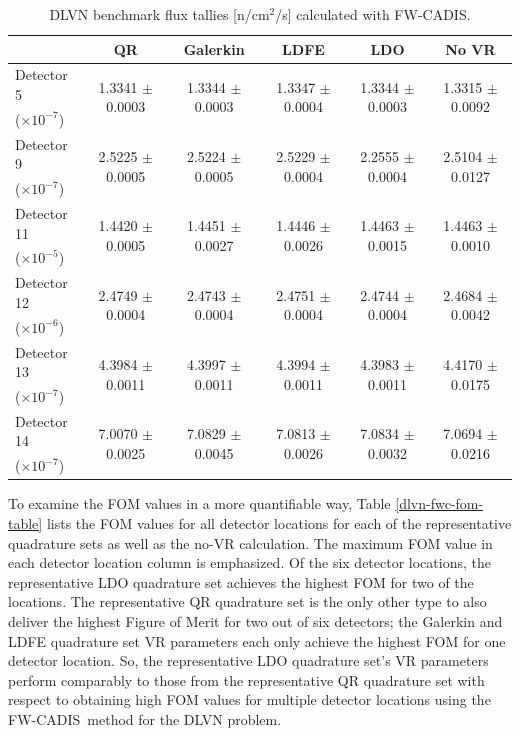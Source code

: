 \documentclass{article} %
\newcommand{\E}[1]{$\times10^{#1}$}
\newcommand{\fwc}{\mbox{FW-CADIS}}
\newcommand{\mr}[1]{\multirow{2}{*}{#1}}
\begin{document}
\begin{table}[!htb]
\centering
\scriptsize
\caption{DLVN benchmark flux tallies [n/cm$^2$/s] calculated with \fwc.}
\label{dlvn-fwc-det}
\begin{tabular}{l|ccccc}
         & \textbf{QR} & \textbf{Galerkin} & \textbf{LDFE} 
         & \textbf{LDO} & \textbf{No VR}  \\ \hline
 Detector 5 & \mr{1.3341 $\pm$ 0.0003} & \mr{1.3344 $\pm$ 0.0003} & \mr{1.3347 $\pm$ 0.0004} &
            \mr{1.3344 $\pm$ 0.0003} & \mr{1.3315 $\pm$ 0.0092} \rule{0pt}{2.6ex} \\
    (\E{-7})      &    &   &  &   &    \\
 Detector 9 & \mr{2.5225 $\pm$ 0.0005} & \mr{2.5224 $\pm$ 0.0005} & \mr{2.5229 $\pm$ 0.0004} &
            \mr{2.2555 $\pm$ 0.0004} & \mr{2.5104 $\pm$ 0.0127} \rule{0pt}{2.6ex}  \\
   (\E{-7}) &   &  &  &  &   \\
 Detector 11 & \mr{1.4420 $\pm$ 0.0005} & \mr{1.4451 $\pm$ 0.0027} & \mr{1.4446 $\pm$ 0.0026} &
            \mr{1.4463 $\pm$ 0.0015} & \mr{1.4463 $\pm$ 0.0010} \rule{0pt}{2.6ex} \\
   (\E{-5}) &   &  &  &  &   \\
 Detector 12 & \mr{2.4749 $\pm$ 0.0004} & \mr{2.4743 $\pm$ 0.0004} & \mr{2.4751 $\pm$ 0.0004} &
            \mr{2.4744 $\pm$ 0.0004} & \mr{2.4684 $\pm$ 0.0042}  \rule{0pt}{2.6ex} \\
    (\E{-6}) &   &  &  &  &   \\
 Detector 13 & \mr{4.3984 $\pm$ 0.0011} & \mr{4.3997 $\pm$ 0.0011} & \mr{4.3994 $\pm$ 0.0011} &
            \mr{4.3983 $\pm$ 0.0011} & \mr{4.4170 $\pm$ 0.0175}  \rule{0pt}{2.6ex} \\
    (\E{-7}) &   &  &  &  &   \\
 Detector 14 & \mr{7.0070 $\pm$ 0.0025} & \mr{7.0829 $\pm$ 0.0045} & \mr{7.0813 $\pm$ 0.0026} &
            \mr{7.0834 $\pm$ 0.0032} & \mr{7.0694 $\pm$ 0.0216}  \rule{0pt}{2.6ex} \\
    (\E{-7}) &   &  &  &  &   \\ \hline
\end{tabular}
\end{table}

To examine the FOM values in a more quantifiable way, Table 
\ref{dlvn-fwc-fom-table} lists the FOM values for all detector locations for
each of the representative quadrature sets as well as the no-VR calculation.
The maximum FOM value in each detector location column is emphasized. Of the
six detector locations, the representative LDO quadrature set achieves the
highest FOM for two of the locations. The representative QR quadrature set is
the only other type to also deliver the highest Figure of Merit for two out of
six detectors; the Galerkin and LDFE quadrature set VR parameters each
only achieve the highest FOM for one detector location. So, the representative
LDO quadrature set's VR parameters perform comparably to those from the
representative QR quadrature set with respect to obtaining high FOM values for
multiple detector locations using the \fwc\ method for the DLVN problem.
\end{document}
